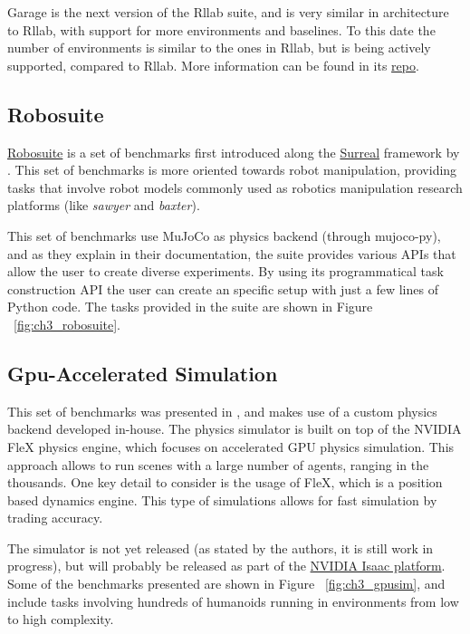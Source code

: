 \figBenchmarkRllabClassic

\figBenchmarkRllabLocomotion

\figBenchmarkRllabHierarchical

Garage is the next version of the Rllab suite, and is very similar in architecture 
to Rllab, with support for more environments and baselines. To this date the number 
of environments is similar to the ones in Rllab, but is being actively supported, 
compared to Rllab. More information can be found in its \href{https://github.com/rlworkgroup/garage}{repo}.

\subsection{Robosuite}
 
\href{https://github.com/StanfordVL/robosuite/}{Robosuite} is a set of benchmarks first 
introduced along the \href{https://surreal.stanford.edu/}{Surreal} 
framework by \cite{Surreal}. This set of benchmarks is more oriented towards robot manipulation,
providing tasks that involve robot models commonly used as robotics manipulation research platforms 
(like \textit{sawyer} and \textit{baxter}).

This set of benchmarks use MuJoCo as physics backend (through mujoco-py), and as they
explain in their documentation, the suite provides various APIs that allow the user
to create diverse experiments. By using its programmatical task construction API
the user can create an specific setup with just a few lines of Python code.
The tasks provided in the suite are shown in Figure ~\ref{fig:ch3_robosuite}.

\figBenchmarksRobosuite

\subsection{Gpu-Accelerated Simulation}

This set of benchmarks was presented in \cite{GpuSim}, and makes use of a custom 
physics backend developed in-house. The physics simulator is built on top of the 
NVIDIA FleX physics engine, which focuses on accelerated GPU physics simulation. 
This approach allows to run scenes with a large number of agents, ranging in the 
thousands. One key detail to consider is the usage of FleX, which is a position 
based dynamics engine. This type of simulations allows for fast simulation by trading
accuracy. 

The simulator is not yet released (as stated by the authors, it is still 
work in progress), but will probably be released as part of the 
\href{https://developer.nvidia.com/isaac-sdk}{NVIDIA Isaac platform}. Some of the 
benchmarks presented are shown in Figure ~\ref{fig:ch3_gpusim}, and include tasks
involving hundreds of humanoids running in environments from low to high complexity.

